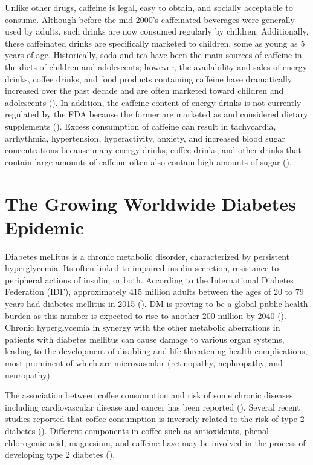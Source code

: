 \documentclass{scrartcl}
\begin{document}
Unlike other drugs, caffeine is legal, easy to obtain, and socially acceptable to consume. Although before the mid 2000's caffeinated beverages were generally used by adults, such drinks are now consumed regularly by children. Additionally, these caffeinated drinks are specifically marketed to children, some as young as 5 years of age. Historically, soda and tea have been the main sources of caffeine in the diets of children and adolescents; however, the availability and sales of energy drinks, coffee drinks, and food products containing caffeine have dramatically increased over the past decade and are often marketed toward children and adolescents (). In addition, the caffeine content of energy drinks is not currently regulated by the FDA because the former are marketed as and considered dietary supplements (). Excess consumption of caffeine can result in tachycardia, arrhythmia, hypertension, hyperactivity, anxiety, and increased blood sugar concentrations because many energy drinks, coffee drinks, and other drinks that contain large amounts of caffeine often also contain high amounts of sugar ().

\section*{The Growing Worldwide Diabetes Epidemic}
\label{sec:org6dbc5e8}
Diabetes mellitus is a chronic metabolic disorder, characterized by persistent hyperglycemia. Its often linked to impaired insulin secretion, resistance to peripheral actions of insulin, or both. According to the International Diabetes Federation (IDF), approximately 415 million adults between the ages of 20 to 79 years had diabetes mellitus in 2015 (). DM is proving to be a global public health burden as this number is expected to rise to another 200 million by 2040 (). Chronic hyperglycemia in synergy with the other metabolic aberrations in patients with diabetes mellitus can cause damage to various organ systems, leading to the development of disabling and life-threatening health complications, most prominent of which are microvascular (retinopathy, nephropathy, and neuropathy).

The association between coffee consumption and risk of some chronic diseases including cardiovascular disease and cancer has been reported (). Several recent studies reported that coffee consumption is inversely related to the risk of type 2 diabetes (). Different components in coffee such as antioxidants, phenol chlorogenic acid, magnesium, and caffeine have may be involved in the process of developing type 2 diabetes ().
\end{document}
